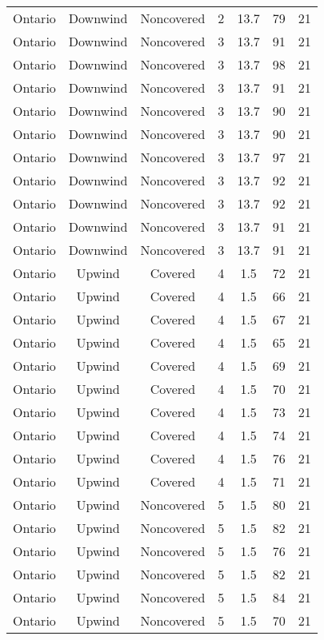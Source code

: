 \documentclass{article}
\begin{document}
\begin{longtable}[H]{ccccccc}
Ontario & Downwind & Noncovered & 2 & 13.7 & 79  & 21 \\
Ontario & Downwind & Noncovered & 3 & 13.7 & 91  & 21 \\
Ontario & Downwind & Noncovered & 3 & 13.7 & 98  & 21 \\
Ontario & Downwind & Noncovered & 3 & 13.7 & 91  & 21 \\
Ontario & Downwind & Noncovered & 3 & 13.7 & 90  & 21 \\
Ontario & Downwind & Noncovered & 3 & 13.7 & 90  & 21 \\
Ontario & Downwind & Noncovered & 3 & 13.7 & 97  & 21 \\
Ontario & Downwind & Noncovered & 3 & 13.7 & 92  & 21 \\
Ontario & Downwind & Noncovered & 3 & 13.7 & 92  & 21 \\
Ontario & Downwind & Noncovered & 3 & 13.7 & 91  & 21 \\
Ontario & Downwind & Noncovered & 3 & 13.7 & 91  & 21 \\
Ontario & Upwind   & Covered     & 4 & 1.5  & 72  & 21 \\
Ontario & Upwind   & Covered     & 4 & 1.5  & 66  & 21 \\
Ontario & Upwind   & Covered     & 4 & 1.5  & 67  & 21 \\
Ontario & Upwind   & Covered     & 4 & 1.5  & 65  & 21 \\
Ontario & Upwind   & Covered     & 4 & 1.5  & 69  & 21 \\
Ontario & Upwind   & Covered     & 4 & 1.5  & 70  & 21 \\
Ontario & Upwind   & Covered     & 4 & 1.5  & 73  & 21 \\
Ontario & Upwind   & Covered     & 4 & 1.5  & 74  & 21 \\
Ontario & Upwind   & Covered     & 4 & 1.5  & 76  & 21 \\
Ontario & Upwind   & Covered     & 4 & 1.5  & 71  & 21 \\
Ontario & Upwind   & Noncovered & 5 & 1.5  & 80  & 21 \\
Ontario & Upwind   & Noncovered & 5 & 1.5  & 82  & 21 \\
Ontario & Upwind   & Noncovered & 5 & 1.5  & 76  & 21 \\
Ontario & Upwind   & Noncovered & 5 & 1.5  & 82  & 21 \\
Ontario & Upwind   & Noncovered & 5 & 1.5  & 84  & 21 \\
Ontario & Upwind   & Noncovered & 5 & 1.5  & 70  & 21 \\

\end{longtable}
\end{document}
